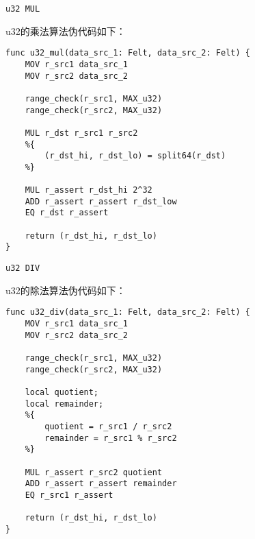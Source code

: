 \verb|u32 MUL|

u32的乘法算法伪代码如下：

\begin{lstlisting}[language={}]
func u32_mul(data_src_1: Felt, data_src_2: Felt) {
    MOV r_src1 data_src_1
    MOV r_src2 data_src_2

    range_check(r_src1, MAX_u32)
    range_check(r_src2, MAX_u32)

    MUL r_dst r_src1 r_src2
    %{
        (r_dst_hi, r_dst_lo) = split64(r_dst)
    %}

    MUL r_assert r_dst_hi 2^32
    ADD r_assert r_assert r_dst_low
    EQ r_dst r_assert

    return (r_dst_hi, r_dst_lo)
}
\end{lstlisting}


\verb|u32 DIV|

u32的除法算法伪代码如下：

\begin{lstlisting}[language={}]
func u32_div(data_src_1: Felt, data_src_2: Felt) {
    MOV r_src1 data_src_1
    MOV r_src2 data_src_2

    range_check(r_src1, MAX_u32)
    range_check(r_src2, MAX_u32)

    local quotient;
    local remainder;
    %{
        quotient = r_src1 / r_src2
        remainder = r_src1 % r_src2
    %}

    MUL r_assert r_src2 quotient
    ADD r_assert r_assert remainder
    EQ r_src1 r_assert

    return (r_dst_hi, r_dst_lo)
}
\end{lstlisting}

